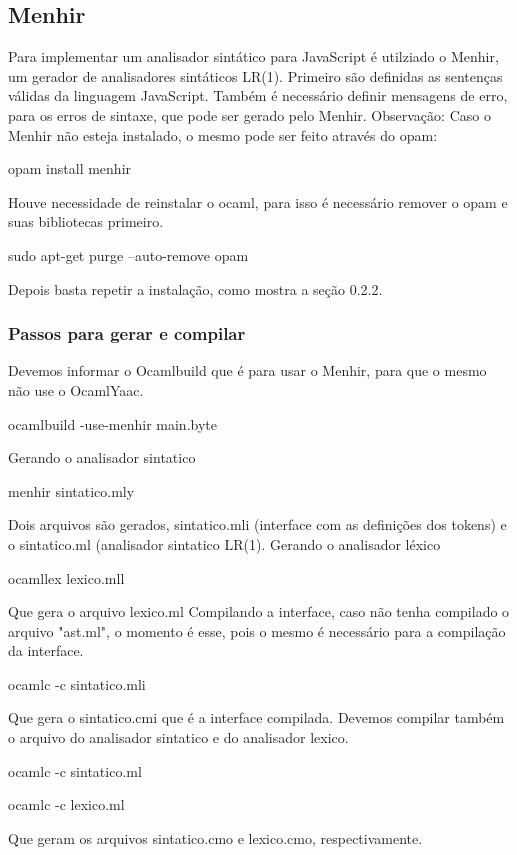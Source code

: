 \documentclass[12pt,a4paper,twoside]{article}
\begin{document}
\subsection{Menhir}
Para implementar um analisador sintático para JavaScript é utilziado o Menhir, um gerador de analisadores sintáticos LR(1).\newline
Primeiro são definidas as sentenças válidas da linguagem JavaScript. Também é necessário definir mensagens de erro, para os erros de sintaxe, que pode ser gerado pelo Menhir.\newline
Observação: Caso o Menhir não esteja instalado, o mesmo pode ser feito através do opam:
\begin{terminal}
opam install menhir
\end{terminal}
Houve necessidade de reinstalar o ocaml, para isso é necessário remover o opam e suas bibliotecas primeiro.
\begin{terminal}
sudo apt-get purge --auto-remove opam
\end{terminal}
Depois basta repetir a instalação, como mostra a seção 0.2.2.

\subsubsection{Passos para gerar e compilar}
Devemos informar o Ocamlbuild que é para usar o Menhir, para que o mesmo não use o OcamlYaac.
\begin{terminal}
ocamlbuild -use-menhir main.byte
\end{terminal}
Gerando o analisador sintatico
\begin{terminal}
menhir sintatico.mly
\end{terminal}
Dois arquivos são gerados, sintatico.mli (interface com as definições dos tokens) e o sintatico.ml (analisador sintatico LR(1).
\newline\newline
Gerando o analisador léxico
\begin{terminal}
ocamllex lexico.mll
\end{terminal}
Que gera o arquivo lexico.ml
\newline\newline
Compilando a interface, caso não tenha compilado o arquivo "ast.ml", o momento é esse, pois o mesmo é necessário para a compilação da interface.
\begin{terminal}
ocamlc -c sintatico.mli
\end{terminal}
Que gera o sintatico.cmi que é a interface compilada.
\newline\newline
Devemos compilar também o arquivo do analisador sintatico e do analisador lexico.
\begin{terminal}
ocamlc -c sintatico.ml

ocamlc -c lexico.ml
\end{terminal}
Que geram os arquivos sintatico.cmo e lexico.cmo, respectivamente.
\end{document}
